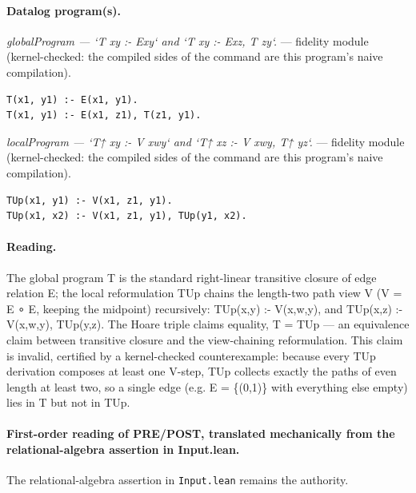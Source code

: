 \documentclass[10pt]{article}
\begin{document}
\paragraph{Datalog program(s).}

{\raggedright\textit{globalProgram --- `T xy :- Exy` and `T xy :- Exz, T zy`.} --- fidelity module (kernel-checked: the compiled sides of the command are this program's naive compilation).\par}

\begin{Verbatim}[fontsize=\scriptsize,breaklines=true,breakanywhere=true,frame=single,framesep=1.5mm]
T(x1, y1) :- E(x1, y1).
T(x1, y1) :- E(x1, z1), T(z1, y1).
\end{Verbatim}

{\raggedright\textit{localProgram --- `T↑ xy :- V xwy` and `T↑ xz :- V xwy, T↑ yz`.} --- fidelity module (kernel-checked: the compiled sides of the command are this program's naive compilation).\par}

\begin{Verbatim}[fontsize=\scriptsize,breaklines=true,breakanywhere=true,frame=single,framesep=1.5mm]
TUp(x1, y1) :- V(x1, z1, y1).
TUp(x1, x2) :- V(x1, z1, y1), TUp(y1, x2).
\end{Verbatim}

\paragraph{Reading.} The global program T is the standard right-linear transitive closure of edge relation E; the local reformulation TUp chains the length-two path view V (V = E ∘ E, keeping the midpoint) recursively: TUp(x,y) :- V(x,w,y), and TUp(x,z) :- V(x,w,y), TUp(y,z). The Hoare triple claims equality, T = TUp --- an equivalence claim between transitive closure and the view-chaining reformulation. This claim is invalid, certified by a kernel-checked counterexample: because every TUp derivation composes at least one V-step, TUp collects exactly the paths of even length at least two, so a single edge (e.g. E = \{(0,1)\} with everything else empty) lies in T but not in TUp.

\paragraph{First-order reading of PRE/POST, translated mechanically from the relational-algebra assertion in Input.lean.} The relational-algebra assertion in \texttt{Input.lean} remains the authority.
\end{document}

